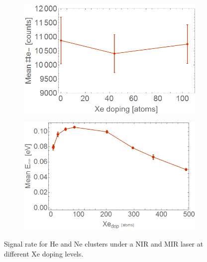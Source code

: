 \begin{figure}[h!]
\begin{subfigure}[l]{0.48\textwidth} 
\includegraphics[width=1\textwidth]{../Images/results/MIR_He_XeCaDop/Xe_Meanelec.png}  \end{subfigure}
\begin{subfigure}[l]{0.48\textwidth}
\includegraphics[width=1\textwidth]{../Images/results/MIR_Ne_XeDop_39K/MeanElec.png} \end{subfigure}
\caption[Xe doping scan-signal rate]{Signal rate for He and Ne clusters under a NIR and MIR laser at different Xe doping levels.}
\label{fig:IntensitySigRate}
\end{figure}

